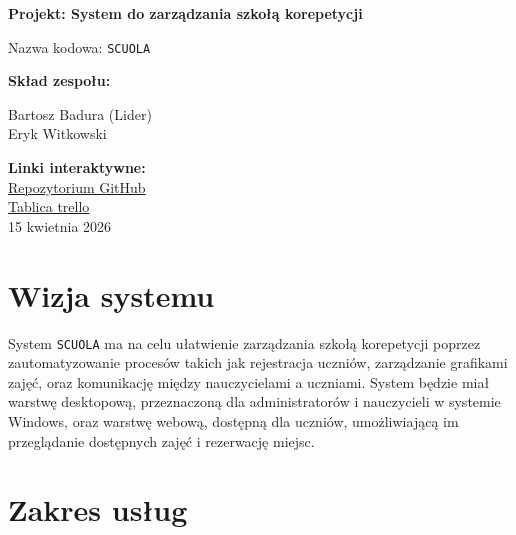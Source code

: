 \documentclass[12pt,a4paper]{article}
\begin{document}
\begin{titlepage}
    \centering
    \vspace*{2cm}
    {\Huge\bfseries Projekt: System do zarządzania szkołą korepetycji \par}
    \vspace{1cm}
    {\Large Nazwa kodowa: \texttt{SCUOLA} \par}
    \vspace{2cm}
    
    {\large \textbf{Skład zespołu:}} \\
    \vspace{0.5cm}
    \begin{center}
        Bartosz Badura (Lider) \\
        Eryk Witkowski \\
    \end{center}
    
    \vfill
    
    {\large \textbf{Linki interaktywne:}} \\
    \vspace{0.5cm}
    \href{https://github.com/badubart/inzOprogramowania}{Repozytorium GitHub} \\
    \vspace{0.2cm}
    \href{https://trello.com/b/pA3IAemn/projekt-scuola}{Tablica trello} \\
    
    \vfill
    {\large 15 kwietnia 2026}
\end{titlepage}

\section{Wizja systemu}
\medskip

System \texttt{SCUOLA} ma na celu ułatwienie zarządzania szkołą korepetycji poprzez zautomatyzowanie procesów takich jak rejestracja uczniów, zarządzanie grafikami zajęć, oraz komunikację między nauczycielami a uczniami. System będzie miał warstwę desktopową, przeznaczoną dla administratorów i nauczycieli w systemie Windows, oraz warstwę webową, dostępną dla uczniów, umożliwiającą im przeglądanie dostępnych zajęć i rezerwację miejsc.

\section{Zakres usług}
\end{document}
